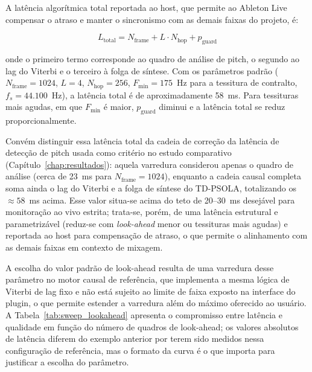 A latência algorítmica total reportada ao host, que permite ao Ableton Live \cite{ableton_live} compensar o atraso e manter o sincronismo com as demais faixas do projeto, é:

\begin{equation}
\label{eq:latencia_total}
L_{\text{total}} = N_{\text{frame}} + L \cdot N_{\text{hop}} + p_{\text{guard}}
\end{equation}

onde o primeiro termo corresponde ao quadro de análise de pitch, o segundo ao lag do Viterbi e o terceiro à folga de síntese. Com os parâmetros padrão ($N_{\text{frame}} = 1024$, $L = 4$, $N_{\text{hop}} = 256$, $F_{\min} = 175$~Hz para a tessitura de contralto, $f_s = 44{.}100$~Hz), a latência total é de aproximadamente 58~ms. Para tessituras mais agudas, em que $F_{\min}$ é maior, $p_{\text{guard}}$ diminui e a latência total se reduz proporcionalmente.

Convém distinguir essa latência total da cadeia de correção da latência de detecção de pitch usada como critério no estudo comparativo (Capítulo~\ref{chap:resultados}): aquela varredura considerou apenas o quadro de análise (cerca de 23~ms para $N_{\text{frame}} = 1024$), enquanto a cadeia causal completa soma ainda o lag do Viterbi e a folga de síntese do TD-PSOLA, totalizando os $\approx 58$~ms acima. Esse valor situa-se acima do teto de 20--30~ms desejável para monitoração ao vivo estrita; trata-se, porém, de uma latência estrutural e parametrizável (reduz-se com \textit{look-ahead} menor ou tessituras mais agudas) e reportada ao host para compensação de atraso, o que permite o alinhamento com as demais faixas em contexto de mixagem.

A escolha do valor padrão de look-ahead resulta de uma varredura desse parâmetro no motor causal de referência, que implementa a mesma lógica de Viterbi de lag fixo e não está sujeito ao limite de faixa exposto na interface do plugin, o que permite estender a varredura além do máximo oferecido ao usuário. A Tabela~\ref{tab:sweep_lookahead} apresenta o compromisso entre latência e qualidade em função do número de quadros de look-ahead; os valores absolutos de latência diferem do exemplo anterior por terem sido medidos nessa configuração de referência, mas o formato da curva é o que importa para justificar a escolha do parâmetro.

